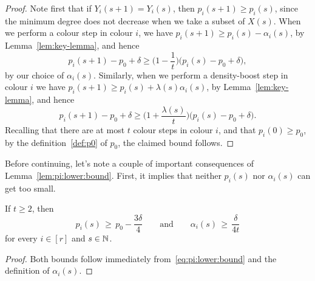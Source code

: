 \begin{proof}
  Note first that if \(Y_i(s+1) = Y_i(s)\), then \(p_i(s+1) \ge p_i(s)\), since the minimum degree does not decrease when we take a subset of \(X(s)\). When we perform a colour step in colour \(i\), %
  we have \(p_i(s+1) \ge p_i(s) - \alpha_i(s)\), by Lemma~\ref{lem:key-lemma}, and hence
  \begin{equation*}
    p_i(s+1) - p_0 + \delta \ge \bigg( 1 - \frac{1}{t} \bigg) \big( p_i(s) - p_0 + \delta \big),
  \end{equation*}
  by our choice of \(\alpha_i(s)\). Similarly, when we perform a density-boost step in colour \(i\)  
  we have \(p_i(s+1) \ge p_i(s) + \lambda(s) \alpha_i(s)\), by Lemma~\ref{lem:key-lemma}, and hence
  \begin{equation*}
    p_i(s+1) - p_0 + \delta \ge \bigg( 1 + \frac{\lambda(s)}{t} \bigg) \big( p_i(s) - p_0 + \delta \big).
  \end{equation*}
  Recalling that there are at most \(t\) colour steps in colour \(i\), and that \(p_i(0) \ge p_0\), by the definition~\eqref{def:p0} of \(p_0\), the claimed bound follows. 
\end{proof}

Before continuing, let's note a couple of important consequences of Lemma~\ref{lem:pi:lower:bound}. First, it implies that neither \(p_i(s)\) nor \(\alpha_i(s)\) can get too small. 

\begin{lemma}
  \label{lem:pi:min} %
  If \(t \ge 2\), then 
  \begin{equation*}
    p_i(s) \, \ge \, p_0 - \frac{3\delta}{4} \qquad \text{and} \qquad \alpha_i(s) \, \ge \, \frac{\delta}{4t}
  \end{equation*}
  for every \(i \in [r]\) and \(s \in \mathbb{N}\). 
\end{lemma}
%
\begin{proof}
  Both bounds follow immediately from~\eqref{eq:pi:lower:bound} and the definition of \(\alpha_i(s)\). 
\end{proof}

